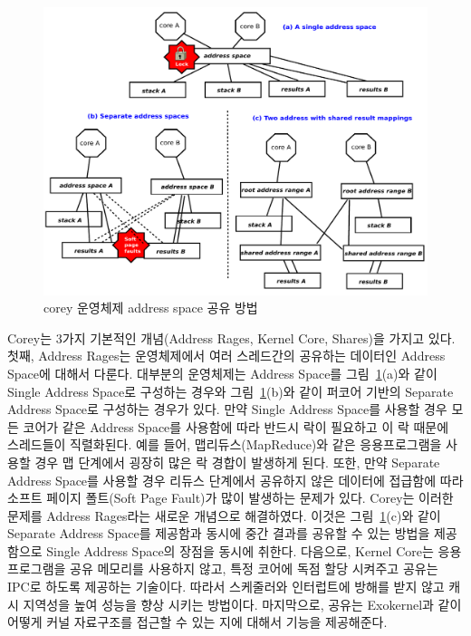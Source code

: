 \begin{figure}[h!]
    \centering
    \includegraphics[width=1\textwidth]{fig/corey/corey}
    \caption{corey 운영체제 address space 공유 방법}
  \label{fig:corey}
\end{figure}

Corey는 3가지 기본적인 개념(Address Rages, Kernel Core, Shares)을 가지고 있다. 
첫째, Address Rages는 운영체제에서 여러 스레드간의 공유하는 데이터인 Address Space에 대해서 다룬다.
대부분의 운영체제는 Address Space를 그림~\ref{fig:corey}(a)와 같이 Single Address Space로
구성하는 경우와 그림~\ref{fig:corey}(b)와 같이 퍼코어 기반의 Separate Address Space로 구성하는 경우가
있다. 
만약 Single Address Space를 사용할 경우 모든 코어가 같은 Address Space를 사용함에 따라 반드시 락이
필요하고 이 락 때문에 스레드들이 직렬화된다.
예를 들어, 맵리듀스(MapReduce)와 같은 응용프로그램을 사용할 경우 맵 단계에서 굉장히 많은 락 경합이 발생하게 된다.
또한, 만약 Separate Address Space를 사용할 경우 리듀스 단계에서 공유하지 않은 데이터에 접급함에 따라 
소프트 페이지 폴트(Soft Page Fault)가 많이 발생하는 문제가 있다.
Corey는 이러한 문제를 Address Rages라는 새로운 개념으로 해결하였다. 
이것은 그림~\ref{fig:corey}(c)와 같이 Separate Address Space를 제공함과 동시에 중간 결과를 공유할 수 있는
방법을 제공함으로 Single Address Space의 장점을 동시에 취한다.
다음으로, Kernel Core는 응용프로그램을 공유 메모리를 사용하지 않고, 특정 코어에 
독점 할당 시켜주고 공유는 IPC로 하도록 제공하는 기술이다. 
따라서 스케줄러와 인터럽트에 방해를 받지 않고 캐시 지역성을 높여 성능을 향상 시키는 방법이다.
마지막으로, 공유는 Exokernel과 같이 어떻게 커널 자료구조를 접근할 수 있는 지에 대해서 기능을 제공해준다.


